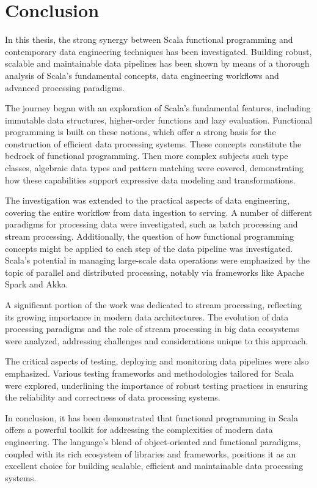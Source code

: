 \chapter{Conclusion}

In this thesis, the strong synergy between Scala functional programming and contemporary data engineering techniques has been investigated. Building robust, scalable and maintainable data pipelines has been shown by means of a thorough analysis of Scala's fundamental concepts, data engineering workflows and advanced processing paradigms.

The journey began with an exploration of Scala's fundamental features, including immutable data structures, higher-order functions and lazy evaluation. Functional programming is built on these notions, which offer a strong basis for the construction of efficient data processing systems. These concepts constitute the bedrock of functional programming. Then more complex subjects such type classes, algebraic data types and pattern matching were covered, demonstrating how these capabilities support expressive data modeling and transformations.

The investigation was extended to the practical aspects of data engineering, covering the entire workflow from data ingestion to serving. A number of different paradigms for processing data were investigated, such as batch processing and stream processing. Additionally, the question of how functional programming concepts might be applied to each step of the data pipeline was investigated. Scala's potential in managing large-scale data operations were emphasized by the topic of parallel and distributed processing, notably via frameworks like Apache Spark and Akka.

A significant portion of the work was dedicated to stream processing, reflecting its growing importance in modern data architectures. The evolution of data processing paradigms and the role of stream processing in big data ecosystems were analyzed, addressing challenges and considerations unique to this approach.

The critical aspects of testing, deploying and monitoring data pipelines were also emphasized. Various testing frameworks and methodologies tailored for Scala were explored, underlining the importance of robust testing practices in ensuring the reliability and correctness of data processing systems.

In conclusion, it has been demonstrated that functional programming in Scala offers a powerful toolkit for addressing the complexities of modern data engineering. The language's blend of object-oriented and functional paradigms, coupled with its rich ecosystem of libraries and frameworks, positions it as an excellent choice for building scalable, efficient and maintainable data processing systems.

